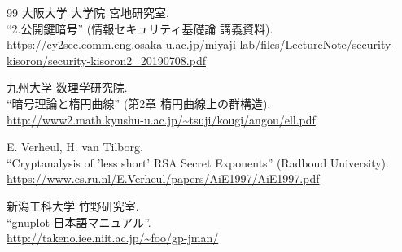 \documentclass[11pt,a4paper]{ltjsarticle}
\begin{document}
\begin{thebibliography}{99}
  大阪大学 大学院 宮地研究室. \\
  \newblock ``2.公開鍵暗号'' (情報セキュリティ基礎論 講義資料). \\
  \newblock \url{https://cy2sec.comm.eng.osaka-u.ac.jp/miyaji-lab/files/LectureNote/security-kisoron/security-kisoron2_20190708.pdf}

  九州大学 数理学研究院. \\
  \newblock ``暗号理論と楕円曲線'' (第2章 楕円曲線上の群構造). \\
  \newblock \url{http://www2.math.kyushu-u.ac.jp/~tsuji/kougi/angou/ell.pdf}

  E. Verheul, H. van Tilborg. \\
  \newblock ``Cryptanalysis of 'less short' RSA Secret Exponents'' (Radboud University). \\
  \newblock \url{https://www.cs.ru.nl/E.Verheul/papers/AiE1997/AiE1997.pdf}

  新潟工科大学 竹野研究室. \\
  \newblock ``gnuplot 日本語マニュアル''. \\
  \newblock \url{http://takeno.iee.niit.ac.jp/~foo/gp-jman/}
\end{thebibliography}
\end{document}
